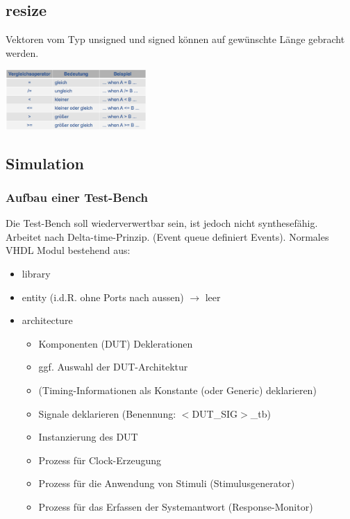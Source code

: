 \vspace{-3\baselineskip}
\begin{multicols}{2}
\subsection{resize}
	Vektoren vom Typ unsigned und signed können auf gewünschte Länge gebracht werden.
	
	\begin{center}
		\includegraphics[width=0.4\textwidth]{images/arithvergleich}
	\end{center}
\end{multicols}
\vspace{-2\baselineskip}
\begin{multicols}{2}
	\subsection{Simulation}
	\subsubsection{Aufbau einer Test-Bench}
	Die Test-Bench soll wiederverwertbar sein, ist jedoch nicht synthesefähig. Arbeitet nach Delta-time-Prinzip. (Event queue definiert Events). Normales VHDL Modul bestehend aus:
	\begin{itemize}
	\setlength\itemsep{-0.5em}
		\item library
		\item entity (i.d.R. ohne Ports nach aussen) $\rightarrow$ leer
		\item architecture
		\begin{itemize}
			\setlength\itemsep{-0.5em}
			\item Komponenten (DUT) Deklerationen
			\item ggf. Auswahl der DUT-Architektur
			\item (Timing-Informationen als Konstante (oder 
				Generic) deklarieren)
			\item Signale deklarieren (Benennung: $<$DUT\_SIG$>$\_tb)
			\item Instanzierung des DUT
			\item Prozess für Clock-Erzeugung
			\item Prozess für die Anwendung von Stimuli 
				(Stimulusgenerator)
			\item Prozess für das Erfassen der Systemantwort 
				(Response-Monitor)
		\end{itemize}
	\end{itemize}
\end{multicols}


